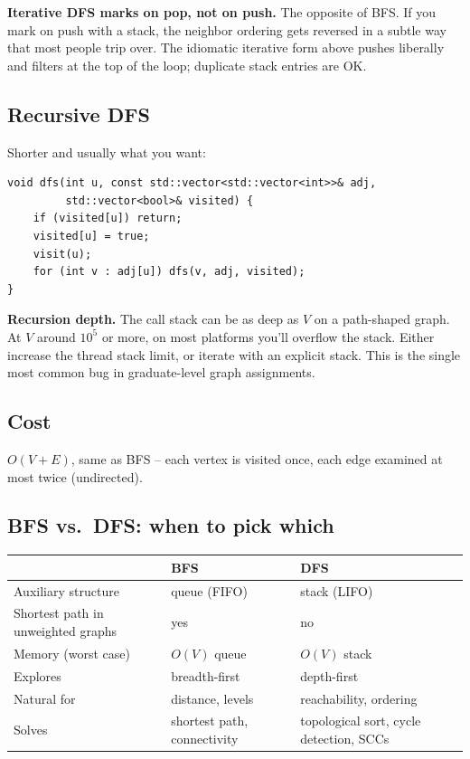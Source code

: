 \documentclass[11pt]{article}
\begin{document}
\begin{warnbox}
\textbf{Iterative DFS marks on pop, not on push.} The opposite of BFS. If you mark on push with a stack, the neighbor ordering gets reversed in a subtle way that most people trip over. The idiomatic iterative form above pushes liberally and filters at the top of the loop; duplicate stack entries are OK.
\end{warnbox}

\subsection*{Recursive DFS}

Shorter and usually what you want:

\begin{lstlisting}[basicstyle=\ttfamily\small,frame=single]
void dfs(int u, const std::vector<std::vector<int>>& adj,
         std::vector<bool>& visited) {
    if (visited[u]) return;
    visited[u] = true;
    visit(u);
    for (int v : adj[u]) dfs(v, adj, visited);
}
\end{lstlisting}

\begin{warnbox}
\textbf{Recursion depth.} The call stack can be as deep as $V$ on a path-shaped graph. At $V$ around $10^5$ or more, on most platforms you'll overflow the stack. Either increase the thread stack limit, or iterate with an explicit stack. This is the single most common bug in graduate-level graph assignments.
\end{warnbox}

\subsection*{Cost}

$O(V + E)$, same as BFS -- each vertex is visited once, each edge examined at most twice (undirected).

\subsection*{BFS vs.\ DFS: when to pick which}

\begin{center}
\begin{tabular}{lll}
\hline
& BFS & DFS \\
\hline
Auxiliary structure & queue (FIFO) & stack (LIFO) \\
Shortest path in unweighted graphs & yes & no \\
Memory (worst case) & $O(V)$ queue & $O(V)$ stack \\
Explores & breadth-first & depth-first \\
Natural for & distance, levels & reachability, ordering \\
Solves & shortest path, connectivity & topological sort, cycle detection, SCCs \\
\hline
\end{tabular}
\end{center}
\end{document}
